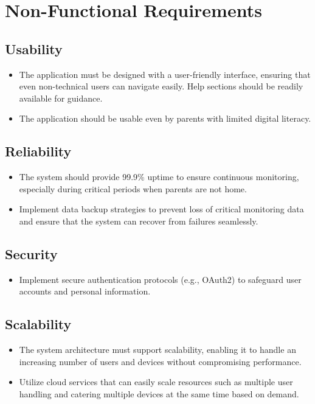 \documentclass[12pt,a4paper]{report}
\begin{document}
\section{Non-Functional Requirements}

\subsection{Usability}
\begin{itemize}
  \item The application must be designed with a user-friendly interface, ensuring that even non-technical users can navigate easily. Help sections should be readily available for guidance.
  \item The application should be usable even by parents with limited digital literacy.
\end{itemize}

\subsection{Reliability}
\begin{itemize}
  \item The system should provide 99.9\% uptime to ensure continuous monitoring, especially during critical periods when parents are not home.
  \item Implement data backup strategies to prevent loss of critical monitoring data and ensure that the system can recover from failures seamlessly.
\end{itemize}

\subsection{Security}
\begin{itemize}
  \item Implement secure authentication protocols (e.g., OAuth2) to safeguard user accounts and personal information.
\end{itemize}

\subsection{Scalability}
\begin{itemize}
  \item The system architecture must support scalability, enabling it to handle an increasing number of users and devices without compromising performance.
  \item Utilize cloud services that can easily scale resources such as multiple user handling and catering multiple devices at the same time based on demand.
\end{itemize}
\end{document}
